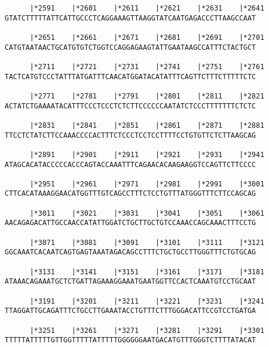 \documentclass{article}
\begin{document}
\begin{Verbatim}
      |*2591    |*2601    |*2611    |*2621    |*2631    |*2641
GTATCTTTTTATTCATTGCCCTCAGGAAAGTTAAGGTATCAATGAGACCCTTAAGCCAAT
                                                            
      |*2651    |*2661    |*2671    |*2681    |*2691    |*2701
CATGTAATAACTGCATGTGTCTGGTCCAGGAGAAGTATTGAATAAGCCATTTCTACTGCT
                                                            
      |*2711    |*2721    |*2731    |*2741    |*2751    |*2761
TACTCATGTCCCTATTTATGATTTCAACATGGATACATATTTCAGTTCTTTCTTTTTCTC
                                                            
      |*2771    |*2781    |*2791    |*2801    |*2811    |*2821
ACTATCTGAAAATACATTTCCCTCCCTCTCTTCCCCCCAATATCTCCCTTTTTTTCTCTC
                                                            
      |*2831    |*2841    |*2851    |*2861    |*2871    |*2881
TTCCTCTATCTTCCAAACCCCACTTTCTCCCTCCTCCTTTTCCTGTGTTCTCTTAAGCAG
                                                            
      |*2891    |*2901    |*2911    |*2921    |*2931    |*2941
ATAGCACATACCCCCACCCAGTACCAAATTTCAGAACACAAGAAGGTCCAGTTCTTCCCC
                                                            
      |*2951    |*2961    |*2971    |*2981    |*2991    |*3001
CTTCACATAAAGGAACATGGTTTGTCAGCCTTTCTCCTGTTTATGGGTTTCTTCCAGCAG
                                                            
      |*3011    |*3021    |*3031    |*3041    |*3051    |*3061
AACAGAGACATTGCCAACCATATTGGATCTGCTTGCTGTCCAAACCAGCAAACTTTCCTG
                                                            
      |*3071    |*3081    |*3091    |*3101    |*3111    |*3121
GGCAAATCACAATCAGTGAGTAAATAGACAGCCTTTCTGCTGCCTTGGGTTTCTGTGCAG
                                                            
      |*3131    |*3141    |*3151    |*3161    |*3171    |*3181
ATAAACAGAAATGCTCTGATTAGAAAGGAAATGAATGGTTCCACTCAAATGTCCTGCAAT
                                                            
      |*3191    |*3201    |*3211    |*3221    |*3231    |*3241
TTAGGATTGCAGATTTCTGCCTTGAAATACCTGTTTCTTTGGGACATTCCGTCCTGATGA
                                                            
      |*3251    |*3261    |*3271    |*3281    |*3291    |*3301
TTTTTATTTTTGTTGGTTTTTATTTTTGGGGGGAATGACATGTTTGGGTCTTTTATACAT
                                                            

\end{Verbatim}
\end{document}
